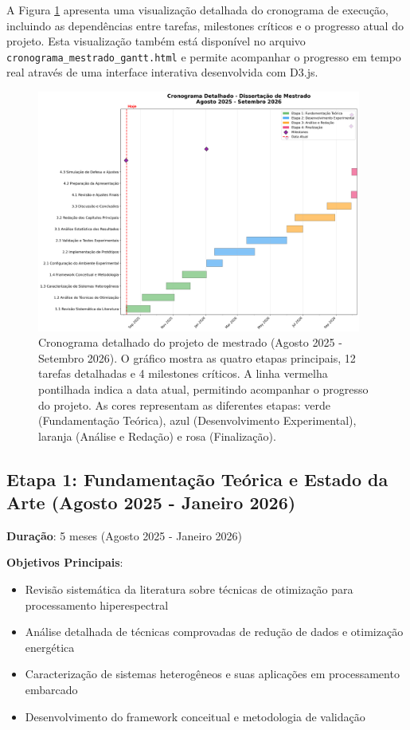 A Figura \ref{fig:cronograma} apresenta uma visualização detalhada do cronograma de execução, incluindo as dependências entre tarefas, milestones críticos e o progresso atual do projeto. Esta visualização também está disponível no arquivo \texttt{cronograma\_mestrado\_gantt.html} e permite acompanhar o progresso em tempo real através de uma interface interativa desenvolvida com D3.js.

\begin{figure}[htbp]
\centering
\includegraphics[width=0.95\textwidth]{figuras/cronograma_mestrado_gantt.png}
\caption{Cronograma detalhado do projeto de mestrado (Agosto 2025 - Setembro 2026). O gráfico mostra as quatro etapas principais, 12 tarefas detalhadas e 4 milestones críticos. A linha vermelha pontilhada indica a data atual, permitindo acompanhar o progresso do projeto. As cores representam as diferentes etapas: verde (Fundamentação Teórica), azul (Desenvolvimento Experimental), laranja (Análise e Redação) e rosa (Finalização).}
\label{fig:cronograma}
\end{figure}

\subsection{Etapa 1: Fundamentação Teórica e Estado da Arte (Agosto 2025 - Janeiro 2026)}

\textbf{Duração}: 5 meses (Agosto 2025 - Janeiro 2026)

\textbf{Objetivos Principais}:
\begin{itemize}
\item Revisão sistemática da literatura sobre técnicas de otimização para processamento hiperespectral
\item Análise detalhada de técnicas comprovadas de redução de dados e otimização energética
\item Caracterização de sistemas heterogêneos e suas aplicações em processamento embarcado
\item Desenvolvimento do framework conceitual e metodologia de validação
\end{itemize}

